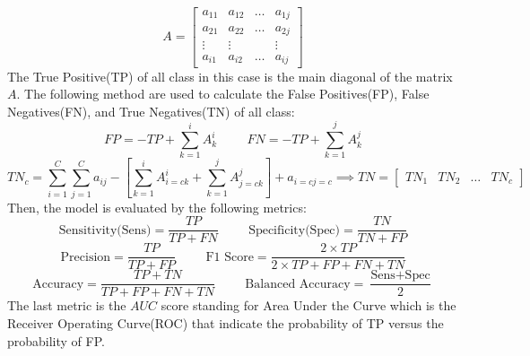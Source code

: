 \[
	A = \begin{bmatrix}
		a_{11} & a_{12} & \dots & a_{1j} \\
		a_{21} & a_{22} & \dots & a_{2j} \\
		\vdots & \vdots	&  & \vdots\\
		a_{i1} & a_{i2} & \dots & a_{ij} 
	\end{bmatrix}
\]
The True Positive(TP) of all class in this case is the main diagonal of the matrix $A$. The following method are used to calculate the False Positives(FP), False Negatives(FN), and True Negatives(TN) of all class:
\[
	FP = -TP + \sum_{k=1}^{i}A^i_k \hspace{1cm} FN = -TP + \sum_{k=1}^{j}A^j_k
\]
\[
	TN_c = \sum_{i=1}^{C}\sum_{j=1}^{C}a_{ij} - \left[ \sum_{k=1}^{i}A^i_{i=c k} + \sum_{k=1}^{j}A^j_{j=c k} \right] + a_{i=c j=c} \implies TN = \begin{bmatrix}
		TN_1 & TN_2 & \dots & TN_c
	\end{bmatrix}
\]
Then, the model is evaluated by the following metrics:
\[\text{Sensitivity(Sens)} = \frac{TP}{TP + FN} \hspace{1cm} \text{Specificity(Spec)} = \frac{TN}{TN + FP}\]
\[\text{Precision} = \frac{TP}{TP + FP} \hspace{1cm} \text{F1 Score} = \frac{2 \times TP}{2 \times TP + FP + FN + TN}\]
\[\text{Accuracy} = \frac{TP + TN}{TP + FP + FN + TN} \hspace{1cm} \text{Balanced Accuracy} = \frac{\text{Sens} + \text{Spec}}{2}\]
The last metric is the $AUC$ score standing for Area Under the Curve which is the Receiver Operating Curve(ROC) that indicate the probability of TP versus the probability of FP.  
